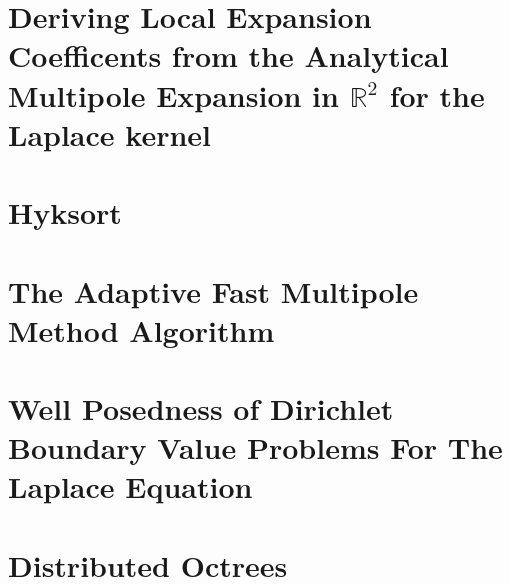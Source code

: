 
\chapter{Deriving Local Expansion Coefficents from the Analytical Multipole Expansion in $\mathbb{R}^2$ for the Laplace kernel}\label{app:locals}


\chapter{Hyksort}\label{app:hyksort}


\chapter{The Adaptive Fast Multipole Method Algorithm}\label{app:adaptive_fmm}


\chapter{Well Posedness of Dirichlet Boundary Value Problems For The Laplace Equation}\label{app:laplace_bvp}


\chapter{Distributed Octrees}\label{app:morton}

